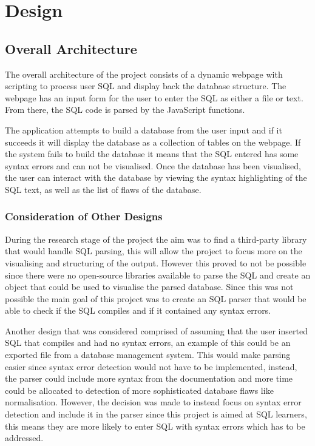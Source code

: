 \chapter{Design}

\section{Overall Architecture}

The overall architecture of the project consists of a dynamic webpage with scripting to process user SQL and display back the database structure. The webpage has an input form for the user to enter the SQL as either a file or text. From there, the SQL code is parsed by the JavaScript functions. 

The application attempts to build a database from the user input and if it succeeds it will display the database as a collection of tables on the webpage. If the system fails to build the database it means that the SQL entered has some syntax errors and can not be visualised. Once the database has been visualised, the user can interact with the database by viewing the syntax highlighting of the SQL text, as well as the list of flaws of the database.

\subsection{Consideration of Other Designs}

During the research stage of the project the aim was to find a third-party library that would handle SQL parsing, this will allow the project to focus more on the visualising and structuring of the output. However this proved to not be possible since there were no open-source libraries available to parse the SQL and create an object that could be used to visualise the parsed database. Since this was not possible the main goal of this project was to create an SQL parser that would be able to check if the SQL compiles and if it contained any syntax errors.

Another design that was considered comprised of assuming that the user inserted SQL that compiles and had no syntax errors, an example of this could be an exported file from a database management system. This would make parsing easier since syntax error detection would not have to be implemented, instead, the parser could include more syntax from the documentation and more time could be allocated to detection of more sophisticated database flaws like normalisation. However, the decision was made to instead focus on syntax error detection and include it in the parser since this project is aimed at SQL learners, this means they are more likely to enter SQL with syntax errors which has to be addressed.

